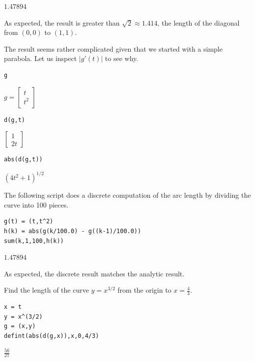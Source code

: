 \noindent
$\displaystyle 1.47894$

\bigskip
\noindent
As expected, the result is greater than $\sqrt2\approx1.414$,
the length of the
diagonal from $(0,0)$ to $(1,1)$.

\bigskip
\noindent
The result seems rather complicated given that we
started with a simple parabola.
Let us inspect $|g'(t)|$ to see why.

\begin{Verbatim}[formatcom=\color{blue},samepage=true]
g
\end{Verbatim}

\noindent
$\displaystyle g=\begin{bmatrix}t\\ t^2\end{bmatrix}$

\begin{Verbatim}[formatcom=\color{blue},samepage=true]
d(g,t)
\end{Verbatim}

\noindent
$\displaystyle \begin{bmatrix}1\\ 2t\end{bmatrix}$

\begin{Verbatim}[formatcom=\color{blue},samepage=true]
abs(d(g,t))
\end{Verbatim}

\noindent
$\displaystyle (4t^2+1)^{1/2}$

\bigskip
\noindent
The following script does a discrete computation of the arc length
by dividing the curve into 100 pieces.

\begin{Verbatim}[formatcom=\color{blue},samepage=true]
g(t) = (t,t^2)
h(k) = abs(g(k/100.0) - g((k-1)/100.0))
sum(k,1,100,h(k))
\end{Verbatim}

\noindent
$\displaystyle 1.47894$

\bigskip
\noindent
As expected, the discrete result matches the analytic result.

\bigskip
\noindent
Find the length of the curve $y=x^{3/2}$ from the origin to
$x=\tfrac{4}{3}$.

\begin{Verbatim}[formatcom=\color{blue},samepage=true]
x = t
y = x^(3/2)
g = (x,y)
defint(abs(d(g,x)),x,0,4/3)
\end{Verbatim}

\noindent
$\displaystyle \tfrac{56}{27}$

